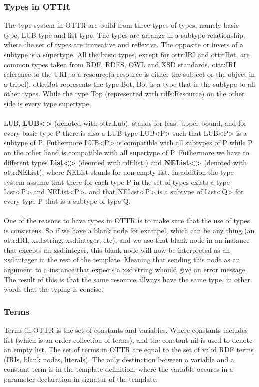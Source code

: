 \subsubsection{Types in OTTR}
The type system in OTTR are build from three types of types, namely basic type, LUB-type and list type. The types are arrange in 
a subtype relationship, where the set of types are transative and reflexive. The opposite or invers of a subtype is a supertype.
All the basic types, except for ottr:IRI and ottr:Bot, are common types taken from RDF, RDFS, OWL and XSD standards. ottr:IRI reference 
to the URI to a resource(a resource is either the subject or the object in a tripel). ottr:Bot represents the type Bot, Bot is a type that 
is the subtype to all other types. While the type Top (represented with rdfs:Resource) on the other side is every type supertype.
\\ \\
LUB, \textbf{LUB<>} (denoted with ottr:Lub), stands for least upper bound, and for every basic type P there is also a LUB-type LUB<P> such that LUB<P> is 
a subtype of P. Futhermore LUB<P> is compatible with all subtypes of P while P on the other hand is compatible with all supertype of P. 
Futhermore we have to different types \textbf{List<>} (deonted with rdf:list ) and \textbf{NEList<>} (denoted with ottr:NEList), where 
NEList stands for non empty list. In addition the 
type system assume that there for each type P in the set of types exists a type List<P> and NEList<P>, and that 
NEList<P> is a subtype of List<Q> for every type P that is a subtype of type Q.
\\ \\
One of the reasons to have types in OTTR is to make sure that the use of types is consistens. So
if we have a blank node for exampel, which can be any thing (an ottr:IRI, xsd:string, xsd:integer, etc), and we use that blank node 
in an instance that excepts an xsd:integer, this blank node will now be interpreted as an xsd:integer in the rest of the template. 
Meaning that sending this node as an argument to a instance that expects a xsd:string whould give an error message. The result of this 
is that the same resource allways have the same type, in other words that the typing is concise. 

\subsubsection{Terms}
Terms in OTTR is the set of constants and variables. Where constants includes list (which is an order collection of terms), and
the constant nil is used to denote an empty list. The set of terms in OTTR are equal to the set of valid RDF terms (IRIs, blank nodes, literals).
The only destinction between a variable and a constant term is in the template definition, where the 
variable occures in a parameter declaration in signatur of the template.